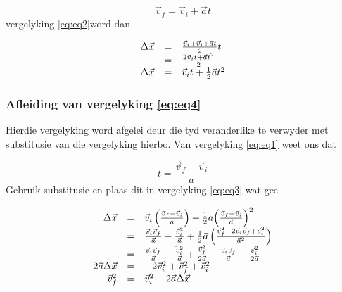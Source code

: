     \begin{equation*}
    \vec{v}_{f}=\vec{v}_{i}+\vec{a}t
      \end{equation*}
          \label{m38796*id76925}vergelyking \ref{eq:eq2}word dan\par 
          \label{m38796*id76932}\nopagebreak\noindent{}
            
    \begin{equation*}
    \begin{array}{ccc}\hfill \Delta \vec{x}& =& \frac{\vec{v}_{i}+\vec{v}_{i}+\vec{a}t}{2}t\hfill \\ & =& \frac{2\vec{v}_{i}t+\vec{a}{t}^{2}}{2}\hfill \\ \hfill \Delta \vec{x}& =& \vec{v}_{i}t+\frac{1}{2}\vec{a}{t}^{2}\hfill \end{array}
      \end{equation*}
        \label{m38796*uid138}


\subsubsection*{Afleiding van vergelyking \ref{eq:eq4}}
            \nopagebreak
Hierdie vergelyking word afgelei deur die tyd veranderlike te verwyder met substitusie van die vergelyking hierbo. Van vergelyking \ref{eq:eq1} weet ons dat\par 
          \label{m38796*id77095}\nopagebreak\noindent{}
            
    \begin{equation*}
    t=\frac{\vec{v}_{f}-\vec{v}_{i}}{a}
      \end{equation*}
          \label{m38796*id77132}Gebruik substitusie en plaas dit in vergelyking \ref{eq:eq3} wat gee\par 
          \label{m38796*uid139}\nopagebreak\noindent{}
            
    \begin{equation*}
    \begin{array}{ccc}
\hfill \Delta \vec{x}& =& \vec{v}_{i}\left(\frac{\vec{v}_{f}-\vec{v}_{i}}{a}\right)+\frac{1}{2}a{\left(\frac{\vec{v}_{f}-\vec{v}_{i}}{\vec{a}}\right)}^{2}\hfill \\ 
& =& \frac{\vec{v}_{i}\vec{v}_{f}}{\vec{a}} - \frac{\vec{v}_{i}^{2}}{\vec{a}}+\frac{1}{2}\vec{a}\left(\frac{\vec{v}_{f}^{2}-2\vec{v}_{i}\vec{v}_{f}+\vec{v}_{i}^{2}}{\vec{a}^{2}}\right)\hfill \\ 
& =& \frac{\vec{v}_{i}\vec{v}_{f}}{\vec{a}}-\frac{\vec\vec{v}_{i}^{2}}{\vec{a}}+\frac{\vec{v}_{f}^{2}}{2\vec{a}}-\frac{\vec{v}_{i}\vec{v}_{f}}{\vec{a}}+\frac{\vec{v}_{i}^{2}}{2\vec{a}}\hfill \\
 \hfill 2\vec{a}\Delta \vec{x}& =& -2\vec{v}_{i}^{2}+\vec{v}_{f}^{2}+\vec{v}_{i}^{2}\hfill \\ \hfill \vec{v}_{f}^{2}& =& \vec{v}_{i}^{2}+2\vec{a}\Delta \vec{x}\hfill
 \end{array}
      \end{equation*}

